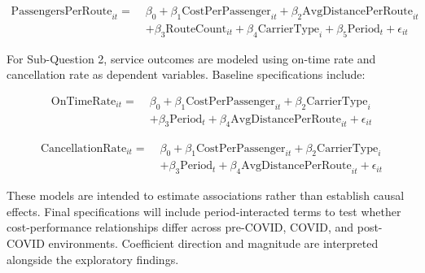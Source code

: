 \documentclass[11pt, letterpaper]{article}
\begin{document}
\begin{align*}
\text{PassengersPerRoute}_{it} =\;& \beta_0
+ \beta_1 \text{CostPerPassenger}_{it}
+ \beta_2 \text{AvgDistancePerRoute}_{it} \\
&+ \beta_3 \text{RouteCount}_{it}
+ \beta_4 \text{CarrierType}_{i}
+ \beta_5 \text{Period}_{t}
+ \epsilon_{it}
\end{align*}

For Sub-Question 2, service outcomes are modeled using on-time rate and cancellation rate as dependent variables. Baseline specifications include:

\begin{align*}
\text{OnTimeRate}_{it} =\;& \beta_0
+ \beta_1 \text{CostPerPassenger}_{it}
+ \beta_2 \text{CarrierType}_{i} \\
&+ \beta_3 \text{Period}_{t}
+ \beta_4 \text{AvgDistancePerRoute}_{it}
+ \epsilon_{it}
\end{align*}

\begin{align*}
\text{CancellationRate}_{it} =\;& \beta_0
+ \beta_1 \text{CostPerPassenger}_{it}
+ \beta_2 \text{CarrierType}_{i} \\
&+ \beta_3 \text{Period}_{t}
+ \beta_4 \text{AvgDistancePerRoute}_{it}
+ \epsilon_{it}
\end{align*}

These models are intended to estimate associations rather than establish causal effects. Final specifications will include period-interacted terms to test whether cost-performance relationships differ across pre-COVID, COVID, and post-COVID environments. Coefficient direction and magnitude are interpreted alongside the exploratory findings.
\end{document}
